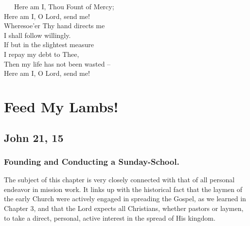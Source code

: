 \documentclass[
]{book}
\begin{document}
~~~Here am I, Thou Fount of Mercy;\\
\hspace*{0.333em}\hspace*{0.333em}\hspace*{0.333em}Here am I, O Lord, send me!\\
\hspace*{0.333em}\hspace*{0.333em}\hspace*{0.333em}Wheresoe'er Thy hand directs me\\
\hspace*{0.333em}\hspace*{0.333em}\hspace*{0.333em}I shall follow willingly.\\
\hspace*{0.333em}\hspace*{0.333em}\hspace*{0.333em}If but in the slightest measure\\
\hspace*{0.333em}\hspace*{0.333em}\hspace*{0.333em}I repay my debt to Thee,\\
\hspace*{0.333em}\hspace*{0.333em}\hspace*{0.333em}Then my life has not been wasted --\\
\hspace*{0.333em}\hspace*{0.333em}\hspace*{0.333em}Here am I, O Lord, send me!

\chapter{Feed My Lambs!}\label{feed-my-lambs}

\section*{John 21, 15}\label{john-21-15}

\subsection*{Founding and Conducting a Sunday-School.}\label{founding-and-conducting-a-sunday-school.}

The subject of this chapter is very closely connected with that of all personal endeavor in mission work. It links up with the historical fact that the laymen of the early Church were actively engaged in spreading the Gospel, as we learned in Chapter 3, and that the Lord expects all Christians, whether pastors or laymen, to take a direct, personal, active interest in the spread of His kingdom.
\end{document}
